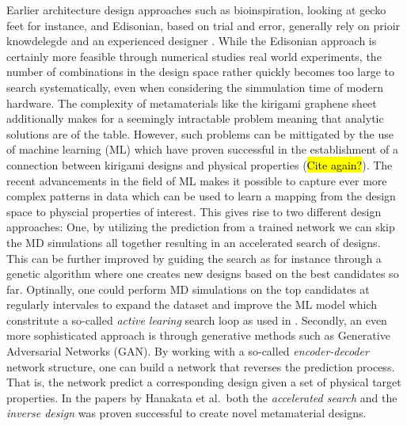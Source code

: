 Earlier architecture design approaches such as bioinspiration, looking at gecko
feet for instance, and Edisonian, based on trial and error, generally rely
on prioir knowdelegde and an experienced designer \cite{Mao}. While the
Edisonian approach is certainly more feasible through numerical studies real world experiments, the number of combinations in the design space rather quickly becomes too large to search systematically, even when considering the simmulation time of modern hardware. The complexity of metamaterials like the kirigami graphene sheet additionally makes for a seemingly intractable problem meaning that analytic solutions are of the table. However, such problems can be mittigated
by the use of machine learning (\acrshort{ML}) which have proven successful in the
establishment of a connection between kirigami designs and physical
properties (\hl{Cite again?}). The recent advancements in the field of
\acrshort{ML} makes it possible to capture ever more complex patterns in data
which can be used to learn a mapping from the design space to physcial properties of interest. This gives rise to two different design approaches: One, by utilizing the prediction from a trained network we can skip
the \acrshort{MD} simulations all together resulting in an accelerated search of
designs. This can be further improved by guiding the search as for instance through a genetic algorithm where one creates new designs based
on the best candidates so far. Optinally, one could perform \acrshort{MD} simulations on the top candidates at regularly intervales to expand the dataset and improve the \acrshort{ML} model which constritute a so-called
\textit{active learing} search loop as used in \cite{PhysRevLett.121.255304}.
Secondly, an even more sophisticated approach is through generative methods such
as Generative Adversarial Networks (GAN). By working with a so-called
\textit{encoder-decoder} network structure, one can build a network that reverses
the prediction process. That is, the network predict a corresponding
design given a set of physical target properties. In the papers by Hanakata et
al.\ both the \textit{accelerated search} and the \textit{inverse design} was
proven successful to create novel metamaterial designs. 


